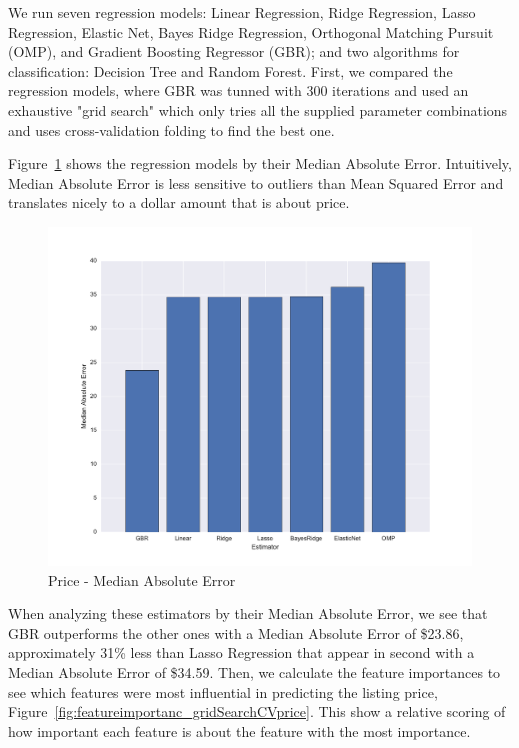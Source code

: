 \documentclass[sigconf]{acmart}
\begin{document}
We run seven regression models: Linear Regression, Ridge Regression, Lasso Regression, Elastic Net, Bayes Ridge Regression, Orthogonal Matching Pursuit (OMP), and Gradient Boosting Regressor (GBR); and two algorithms for classification: Decision Tree and Random Forest. First, we compared the regression models, where GBR was tunned with 300 iterations and used an exhaustive "grid search" which only tries all the supplied parameter combinations and uses cross-validation folding to find the best one.

Figure~\ref{fig:medianabsoluteerrorprice} shows the regression models by their Median Absolute Error. Intuitively, Median Absolute Error is less sensitive to outliers than Mean Squared Error and translates nicely to a dollar amount that is about price.

\begin{figure}[!htpb]
	\centering
	\includegraphics[width=0.8\linewidth]{images/median_absolute_error_price}
	\caption{Price - Median Absolute Error}
	\label{fig:medianabsoluteerrorprice}
\end{figure}

When analyzing these estimators by their Median Absolute Error, we see that GBR outperforms the other ones with a Median Absolute Error of \$23.86, approximately 31\% less than Lasso Regression that appear in second with a Median Absolute Error of \$34.59. Then, we calculate the feature importances to see which features were most influential in predicting the listing price, Figure~\ref{fig:featureimportanc_gridSearchCVprice}. This show a relative scoring of how important each feature is about the feature with the most importance.
\end{document}
